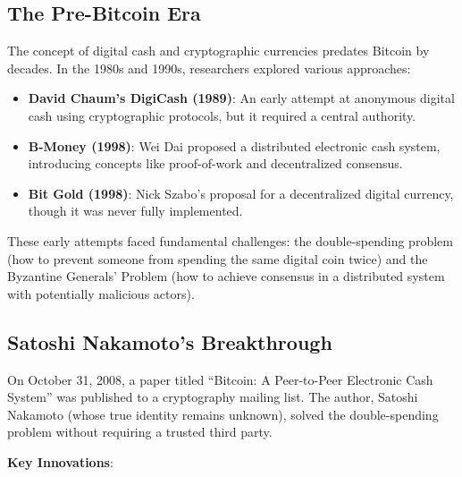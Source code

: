 \subsection{The Pre-Bitcoin Era}
\label{subsec:pre-bitcoin}

The concept of digital cash and cryptographic currencies predates Bitcoin by decades. In the 1980s and 1990s, researchers explored various approaches:

\begin{itemize}
  \item \textbf{David Chaum's DigiCash (1989)}: An early attempt at anonymous digital cash using cryptographic protocols, but it required a central authority.
  \item \textbf{B-Money (1998)}: Wei Dai proposed a distributed electronic cash system, introducing concepts like proof-of-work and decentralized consensus.
  \item \textbf{Bit Gold (1998)}: Nick Szabo's proposal for a decentralized digital currency, though it was never fully implemented.
\end{itemize}

These early attempts faced fundamental challenges: the double-spending problem (how to prevent someone from spending the same digital coin twice) and the Byzantine Generals' Problem (how to achieve consensus in a distributed system with potentially malicious actors).

\subsection{Satoshi Nakamoto's Breakthrough}
\label{subsec:satoshi-breakthrough}

On October 31, 2008, a paper titled ``Bitcoin: A Peer-to-Peer Electronic Cash System'' was published to a cryptography mailing list. The author, Satoshi Nakamoto (whose true identity remains unknown), solved the double-spending problem without requiring a trusted third party.

\textbf{Key Innovations}:

